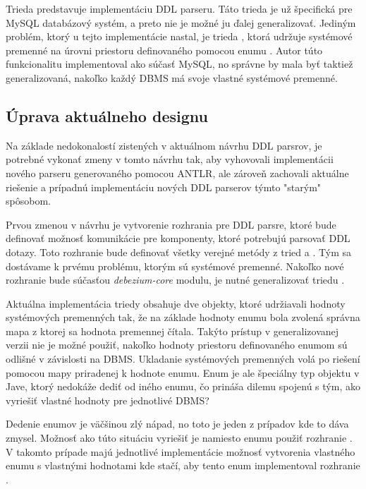 Trieda  predstavuje implementáciu DDL parseru. Táto trieda je už špecifická pre MySQL databázový systém, a preto nie je možné ju ďalej generalizovať. Jediným problém, ktorý u tejto implementácie nastal, je trieda , ktorá udržuje systémové premenné na úrovni priestoru definovaného pomocou enumu . Autor túto funkcionalitu implementoval ako súčasť MySQL, no správne by mala byť taktiež generalizovaná, nakoľko každý DBMS má svoje vlastné systémové premenné.

\subsection{Úprava aktuálneho designu}
Na základe nedokonalostí zistených v aktuálnom návrhu DDL parsrov, je potrebné vykonať zmeny v tomto návrhu tak, aby vyhovovali implementácii nového parseru generovaného pomocou ANTLR, ale zároveň zachovali aktuálne riešenie a prípadnú implementáciu nových DDL parserov týmto "starým"{ }spôsobom.

Prvou zmenou v návrhu je vytvorenie rozhrania pre DDL parsre, ktoré bude definovať možnosť komunikácie pre komponenty, ktoré potrebujú parsovať DDL dotazy. Toto rozhranie bude definovať všetky verejné metódy z tried  a . Tým sa dostávame k prvému problému, ktorým sú systémové premenné. Nakoľko nové rozhranie bude súčasťou \textit{debezium-core} modulu, je nutné generalizovať triedu . 

Aktuálna implementácia triedy  obsahuje dve  objekty, ktoré udržiavali hodnoty systémových premenných tak, že na základe hodnoty enumu  bola zvolená správna mapa z ktorej sa hodnota premennej čítala. Takýto prístup v generalizovanej verzii nie je možné použiť, nakoľko hodnoty priestoru definovaného enumom  sú odlišné v závislosti na DBMS. Ukladanie systémových premenných volá po riešení pomocou mapy priradenej k hodnote  enumu. Enum je ale špeciálny typ objektu v Jave, ktorý nedokáže dediť od iného enumu, čo prináša dilemu spojenú s tým, ako vyriešiť vlastné hodnoty  pre jednotlivé DBMS? 

Dedenie enumov je väčšinou zlý nápad, no toto je jeden z prípadov kde to dáva zmysel. Možnosť ako túto situáciu vyriešiť je namiesto enumu  použiť rozhranie . V takomto prípade majú jednotlivé implementácie možnosť vytvorenia vlastného enumu s vlastnými hodnotami kde stačí, aby tento enum implementoval rozhranie . \cite{effective_java}

